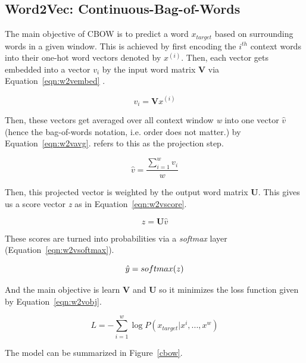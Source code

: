 \subsection{Word2Vec: Continuous-Bag-of-Words}

The main objective of CBOW is to predict a word  $x_{target}$ based on surrounding words in a given window. This is achieved by first encoding the $i^{th}$ context words into their one-hot word vectors denoted by $x^{(i)}$. Then, each vector gets embedded into a vector $v_i$ by the input word matrix \textbf{V} via Equation~\ref{eqn:w2vembed} \citep{chaubard2016}.

\begin{equation}
	\label{eqn:w2vembed}
	v_i = \mathbf{V}x^{(i)}
\end{equation}

Then, these vectors get averaged over all context window \textit{w} into one vector $\hat{v}$ (hence the bag-of-words notation, i.e. order does not matter.) by Equation~\ref{eqn:w2vavg}. \cite{mikolov2013efficient} refers to this as the projection step.

\begin{equation}
	\label{eqn:w2vavg}
	\hat{v} = \frac{\sum_{i=1}^{w} v_i}{w}
\end{equation}

Then, this projected vector is weighted by the output word matrix \textbf{U}. This gives us a score vector \textit{z} as in Equation~\ref{eqn:w2vscore}.

\begin{equation}
	\label{eqn:w2vscore}
	z = \mathbf{U}\hat{v}
\end{equation}

These scores are turned into probabilities via a \textit{softmax} layer (Equation~\ref{eqn:w2vsoftmax}).

\begin{equation}
	\label{eqn:w2vsoftmax}
	\hat{y} = \mathnormal{softmax}(z)
\end{equation}

And the main objective is learn \textbf{V} and  \textbf{U} so it minimizes the loss function given by Equation~\ref{eqn:w2vobj}.

\begin{equation}
	\label{eqn:w2vobj}
L = -\sum_{i=1}^{w} \log P(x_{target}|x^{i}, ..., x^{w})
\end{equation}

The model can be summarized in Figure~\ref{cbow}.


